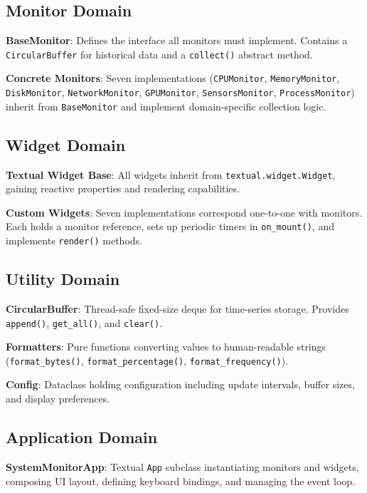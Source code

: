 \documentclass[12pt,a4paper,oneside]{report}
\begin{document}
\subsection{Monitor Domain}

\textbf{BaseMonitor}: Defines the interface all monitors must implement. Contains a \texttt{CircularBuffer} for historical data and a \texttt{collect()} abstract method.

\textbf{Concrete Monitors}: Seven implementations (\texttt{CPUMonitor}, \texttt{MemoryMonitor}, \texttt{DiskMonitor}, \texttt{NetworkMonitor}, \texttt{GPUMonitor}, \texttt{SensorsMonitor}, \texttt{ProcessMonitor}) inherit from \texttt{BaseMonitor} and implement domain-specific collection logic.

\subsection{Widget Domain}

\textbf{Textual Widget Base}: All widgets inherit from \texttt{textual.widget.Widget}, gaining reactive properties and rendering capabilities.

\textbf{Custom Widgets}: Seven implementations correspond one-to-one with monitors. Each holds a monitor reference, sets up periodic timers in \texttt{on\_mount()}, and implements \texttt{render()} methods.

\subsection{Utility Domain}

\textbf{CircularBuffer}: Thread-safe fixed-size deque for time-series storage. Provides \texttt{append()}, \texttt{get\_all()}, and \texttt{clear()}.

\textbf{Formatters}: Pure functions converting values to human-readable strings (\texttt{format\_bytes()}, \texttt{format\_percentage()}, \texttt{format\_frequency()}).

\textbf{Config}: Dataclass holding configuration including update intervals, buffer sizes, and display preferences.

\subsection{Application Domain}

\textbf{SystemMonitorApp}: Textual \texttt{App} subclass instantiating monitors and widgets, composing UI layout, defining keyboard bindings, and managing the event loop.
\end{document}
